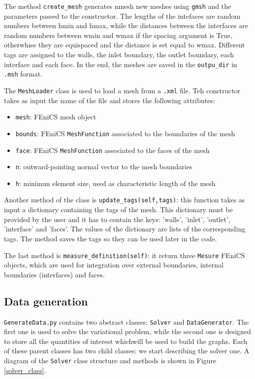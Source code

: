 \documentclass[11pt,a4paper]{article}
\begin{document}
The method \texttt{create\_mesh} generates nmesh new meshes using \texttt{gmsh} and the parameters passed to the constructor. The lengths of the intefaces are random numbers between hmin and hmax, while the distances between the interfaces are random numbers between wmin and wmax if the spacing argument is True, otherwhise they are equispaced and the distance is set equal to wmax. Different tags are assigned to the walls, the inlet boundary, the outlet boundary, each interface and each face. In the end, the meshes are saved in the \texttt{outpu\_dir} in \texttt{.msh} format.


The \texttt{MeshLoader} class is used to load a mesh from a \texttt{.xml} file. Teh constructor takes as input the name of the file and stores the following attributes:
\begin{itemize}
    \item \texttt{mesh}: FEniCS mesh object
    \item \texttt{bounds}: FEniCS \texttt{MeshFunction} associated to the boundaries of the mesh
    \item \texttt{face}: FEniCS \texttt{MeshFunction} associated to the faces of the mesh
    \item \texttt{n}: outward-pointing normal vector to the mesh boundaries
    \item \texttt{h}: minimun element size, used as characteristic length of the mesh
\end{itemize}

Another method of the class is \texttt{update\_tags(self,tags)}: this function takes as input a dictionary containing the tags of the mesh. This dictionary must be provided by the user and it has to contain the keys: 'walls', 'inlet', 'outlet', 'interface' and 'faces'. The values of the dictionary are lists of the corresponding tags. The method saves the tags so they can be used later in the code. 

The last method is \texttt{measure\_definition(self)}: it return three \texttt{Mesure} FEniCS objects, which are used for integration over external boundaries, internal boundaries (interfaces) and faces. 

\subsection{Data generation}

\texttt{GenerateData.py} contains two abstract classes: \texttt{Solver} and \texttt{DataGenerator}. The first one is used to solve the variational problem, while the second one is designed to store all the quantities of interest whichwill be used to build the graphs. Each of these parent classes has two child classes: we start describing the solver one.
A diagram of the \texttt{Solver} class structure and methods is shown in Figure \ref{solver_class}.
\end{document}

